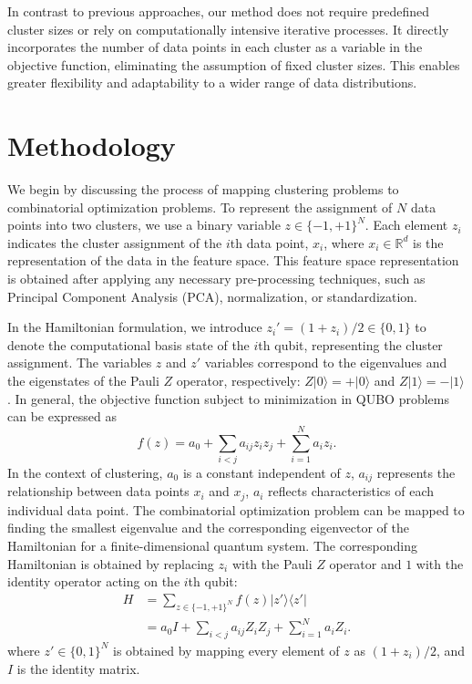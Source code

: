 \documentclass[showpacs,twocolumn,superscriptaddress]{revtex4-2}
\begin{document}
In contrast to previous approaches, our method does not require predefined cluster sizes or rely on computationally intensive iterative processes. It directly incorporates the number of data points in each cluster as a variable in the objective function, eliminating the assumption of fixed cluster sizes. This enables greater flexibility and adaptability to a wider range of data distributions.

\section{Methodology}
We begin by discussing the process of mapping clustering problems to combinatorial optimization problems. To represent the assignment of $N$ data points into two clusters, we use a binary variable $z \in \{ -1, +1 \}^N$. Each element $z_i$ indicates the cluster assignment of the $i$th data point, $x_i$, where $x_i\in\mathbb{R}^{d}$ is the representation of the data in the feature space. This feature space representation is obtained after applying any necessary pre-processing techniques, such as Principal Component Analysis (PCA), normalization, or standardization.
 
In the Hamiltonian formulation, we introduce $z_i' = (1+z_i)/2\in \{0,1\}$ to denote the computational basis state of the $i$th qubit, representing the cluster assignment. The variables $z$ and $z'$ variables correspond to the eigenvalues and the eigenstates of the Pauli $Z$ operator, respectively: $Z|0\rangle = +|0\rangle$ and $Z|1\rangle = -|1\rangle$.
In general, the objective function subject to minimization in QUBO problems can be expressed as
\begin{equation} \label{eq:qubo}
    f(z) = a_0 + \sum_{i<j} a_{ij}z_iz_j + \sum_{i=1}^Na_iz_i.
\end{equation}
In the context of clustering, $a_0$ is a constant independent of $z$, $a_{ij}$ represents the relationship between data points $x_i$ and $x_j$, $a_i$ reflects characteristics of each individual data point. The combinatorial optimization problem can be mapped to finding the smallest eigenvalue and the corresponding eigenvector of the Hamiltonian for a finite-dimensional quantum system. The corresponding Hamiltonian is obtained by replacing $z_i$ with the Pauli $Z$ operator and $1$ with the identity operator acting on the $i$th qubit:
\begin{align} 
    H &= \sum_{z\in\lbrace -1,+1\rbrace^N}f(z)|z'\rangle\langle z'| \\&= a_0 I +  \sum_{i<j}a_{ij}Z_iZ_j + \sum_{i=1}^N a_i Z_i.\label{eq:hamiltonian}
\end{align}
where $z'\in \lbrace 0,1\rbrace^N$ is obtained by mapping every element of $z$ as $(1+z_i)/2$, and $I$ is the identity matrix.
\end{document}
